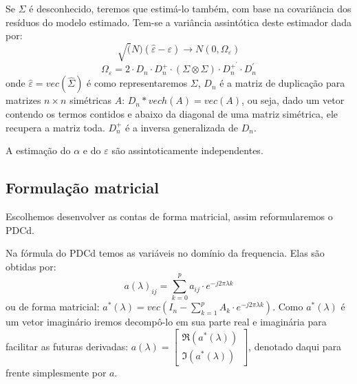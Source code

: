\documentclass[a4paper,10pt]{article}
\begin{document}
Se $\Sigma$ é desconhecido, teremos que estimá-lo também, com base na covariância dos resíduos do modelo estimado. Tem-se a variância assintótica deste estimador dada por:
\begin{equation} 
\sqrt(N) (\hat{\varepsilon} - \varepsilon) \to N(0, \Omega_{\varepsilon})
\end{equation}
\begin{equation}
\Omega_{\varepsilon} = 2 \cdot D_{n} \cdot D_{n}^{+} \cdot (\Sigma \otimes \Sigma) \cdot D_{n}^{+^{'}} \cdot D_{n}^{'}
\end{equation}
onde $\hat{\varepsilon} = vec(\hat{\Sigma})$ é como representaremos $\Sigma$, $D_{n}$ é a matriz de duplicação para matrizes $ n \times n$ simétricas $A$: $D_{n}*vech(A) = vec(A)$, ou seja, dado um vetor contendo os termos contidos e abaixo da diagonal de uma matriz simétrica, ele recupera a matriz toda. $D_{n}^{+}$ é a inversa generalizada de $D_{n}$.

A estimação do $\alpha$ e do $\varepsilon$ são assintoticamente independentes.

\subsection{Formulação matricial}

Escolhemos desenvolver as contas de forma matricial, assim reformularemos o PDCd.

Na fórmula do PDCd temos as variáveis no domínio da frequencia. Elas são obtidas por:
\begin{equation}
a(\lambda)_{ij} = \sum_{k = 0}^{p} a_{ij} \cdot e^{-j2 \pi \lambda k}
\end{equation}
ou de forma matricial: $a^{\ast}(\lambda) = vec(I_{n} - \sum_{k=1}^{p} {A_{k} \cdot e^{-j2\pi\lambda k}})$. Como $a^{\ast}(\lambda)$ é um vetor imaginário iremos decompô-lo em sua parte real e imaginária para facilitar as futuras derivadas: $a(\lambda) = \left[ \begin{array}{c} \Re(a^{\ast}(\lambda)) \\ \Im(a^{\ast}(\lambda)) \end{array} \right]$, denotado daqui para frente simplesmente por $a$.
\end{document}
